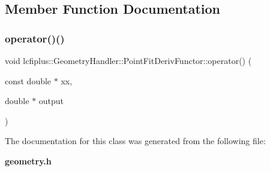 \subsection{Member Function Documentation}
\mbox{\label{classlcfiplus_1_1GeometryHandler_1_1PointFitDerivFunctor_af42b26914458ca24a58f90c7ce8dc4e1}} 
\subsubsection{operator()()}
{\footnotesize\ttfamily void lcfiplus\+::\+Geometry\+Handler\+::\+Point\+Fit\+Deriv\+Functor\+::operator() (\begin{DoxyParamCaption}\item[{const double $\ast$}]{xx,  }\item[{double $\ast$}]{output }\end{DoxyParamCaption})\hspace{0.3cm}{\ttfamily [inline]}}



The documentation for this class was generated from the following file\+:\begin{DoxyCompactItemize}
\item 
\textbf{ geometry.\+h}\end{DoxyCompactItemize}
